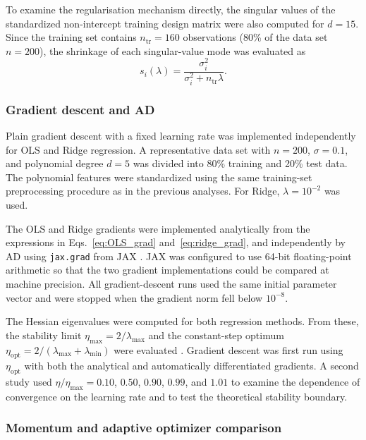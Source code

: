 \documentclass[aps,rmp,reprint,amsmath,amssymb,graphicx,longbibliography]{revtex4-1}
\begin{document}
To examine the regularisation mechanism directly, the singular values of the
standardized non-intercept training design matrix were also computed for
$d=15$. Since the training set contains $n_{\mathrm{tr}}=160$ observations (80\% of the data set $n=200$), the shrinkage of each singular-value mode was evaluated as
\begin{equation}
    s_i(\lambda)
    =
    \frac{\sigma_i^2}
         {\sigma_i^2+n_{\mathrm{tr}}\lambda}.
\end{equation}

\subsubsection*{Gradient descent and AD}

Plain gradient descent with a fixed learning rate was implemented independently
for OLS and Ridge regression. A representative data set with $n=200$,
$\sigma=0.1$, and polynomial degree $d=5$ was divided into 80\% training and
20\% test data. The polynomial features were standardized using the same
training-set preprocessing procedure as in the previous analyses. For Ridge,
$\lambda=10^{-2}$ was used.

The OLS and Ridge gradients were implemented analytically from the expressions in Eqs.~\eqref{eq:OLS_grad} and~\eqref{eq:ridge_grad}, and independently by AD using
\texttt{jax.grad} from JAX \cite{jax2018github}. JAX was configured to use
64-bit floating-point arithmetic so that the two gradient implementations could
be compared at machine precision. All gradient-descent runs used the same
initial parameter vector and were stopped when the gradient norm fell below
$10^{-8}$.

The Hessian eigenvalues were computed for both regression methods. From these,
the stability limit $\eta_{\max}=2/\lambda_{\max}$ and the constant-step optimum
$\eta_{\mathrm{opt}}=2/(\lambda_{\max}+\lambda_{\min})$ were evaluated
\cite{HjorthJensen2026MLPSCh4}. Gradient descent was first run using
$\eta_{\mathrm{opt}}$ with both the analytical and automatically differentiated
gradients. A second study used $\eta/\eta_{\max}=0.10$, $0.50$, $0.90$, $0.99$, and $1.01$ to examine the dependence of convergence on the learning rate and to test the theoretical stability boundary.

\subsubsection*{Momentum and adaptive optimizer comparison}
\end{document}
